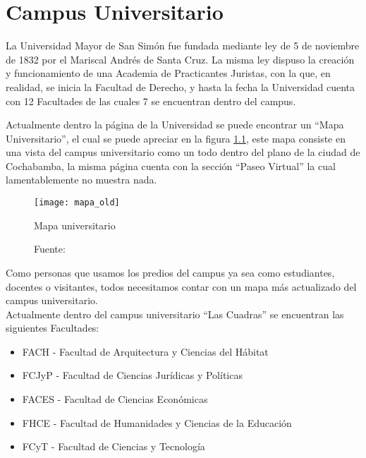 \chapter{Campus Universitario}
\label{chap:Campus Universitario}

La Universidad Mayor de San Simón fue fundada mediante ley de 5 de noviembre de 1832 por el Mariscal Andrés de Santa Cruz. La misma ley dispuso la creación y funcionamiento de una Academia de Practicantes Juristas, con la que, en realidad, se inicia la Facultad de Derecho, y hasta la fecha la Universidad cuenta con 12 Facultades de las cuales 7 se encuentran dentro del campus. \cite{umss_history}

Actualmente dentro la página de la Universidad se puede encontrar un ``Mapa Universitario'', el cual se puede apreciar en la figura \ref{fig:mapa_old}, este mapa consiste en una vista del campus universitario como un todo dentro del plano de la ciudad de Cochabamba, la misma página cuenta con la sección ``Paseo Virtual'' la cual lamentablemente no muestra nada.\\

\begin{figure}[H]
  \begin{center}
    \texttt{[image: mapa\_old]}
    \caption{Mapa universitario}
    \label{fig:mapa_old}
    \caption*{Fuente: \cite{umss_mapa}}
  \end{center}
\end{figure}


Como personas que usamos los predios del campus ya sea como estudiantes, docentes o visitantes, todos necesitamos contar con un mapa más actualizado del campus universitario.\\

Actualmente dentro del campus universitario ``Las Cuadras'' se encuentran las siguientes Facultades:

\begin{itemize}
\item FACH - Facultad de Arquitectura y Ciencias del Hábitat

\item FCJyP - Facultad de Ciencias Jurídicas y Políticas

\item FACES - Facultad de Ciencias Económicas


\item FHCE - Facultad de Humanidades y Ciencias de la Educación

\item FCyT - Facultad de Ciencias y Tecnología

\end{itemize}


